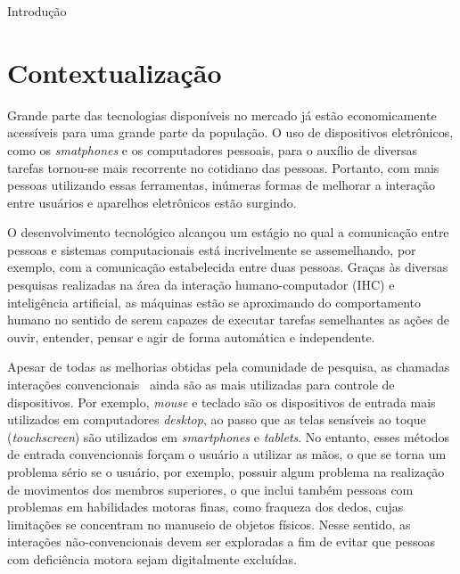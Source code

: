 \begin{chapter}{Introdução}
\vspace{-0.5cm}
\section{Contextualização}
Grande parte das tecnologias disponíveis no mercado já estão economicamente
acessíveis para uma grande parte da população. O uso de dispositivos
eletrônicos, como os \textit{smatphones} e os computadores pessoais, para o
auxílio de diversas tarefas tornou-se mais recorrente no cotidiano das pessoas.
Portanto, com mais pessoas utilizando essas ferramentas, inúmeras formas de
melhorar a interação entre usuários e aparelhos eletrônicos estão surgindo. %

O desenvolvimento tecnológico alcançou um estágio no qual a comunicação entre
pessoas e sistemas computacionais está incrivelmente se assemelhando, por
exemplo, com a comunicação estabelecida entre duas pessoas. Graças às diversas
pesquisas realizadas na área da interação humano-computador (IHC) e inteligência
artificial, as máquinas estão se aproximando do comportamento humano no sentido
de serem capazes de executar tarefas semelhantes as ações de ouvir, entender,
pensar e agir de forma automática e independente. %

Apesar de todas as melhorias obtidas pela comunidade de pesquisa, as chamadas
interações convencionais~\cite{Preece15} ainda são as mais utilizadas para
controle de dispositivos. Por exemplo, \textit{mouse} e teclado são os
dispositivos de entrada mais utilizados em computadores \textit{desktop}, ao
passo que as telas sensíveis ao toque (\textit{touchscreen}) são utilizados em
\textit{smartphones} e \textit{tablets}. No entanto, esses métodos de entrada
convencionais forçam o usuário a utilizar as mãos, o que se torna um problema
sério se o usuário, por exemplo, possuir algum problema na realização de
movimentos dos membros superiores, o que inclui também pessoas com problemas em
habilidades motoras finas, como fraqueza dos dedos, cujas limitações se
concentram no manuseio de objetos físicos. Nesse sentido, as interações
não-convencionais devem ser exploradas a fim de evitar que pessoas com
deficiência motora sejam digitalmente excluídas.  


\end{chapter}
